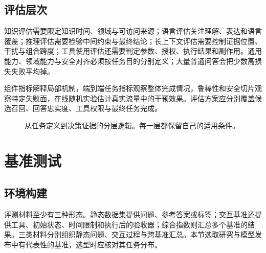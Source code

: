 \documentclass[../textbook.tex]{subfiles}
\begin{document}
\subsection{评估层次}
知识评估需要限定知识时间、领域与可访问来源；语言评估关注理解、表达和语言覆盖；推理评估需要检验中间约束与最终结论；长上下文评估需要控制证据位置、干扰与组合跨度；工具使用评估还需要判定参数、授权、执行结果和副作用。通用能力、领域能力与安全对齐必须按任务目的分别定义；大量普通问答会把少数高损失失败平均掉。

组件指标解释局部机制，端到端任务指标观察整体完成情况，鲁棒性和安全切片观察特定失败面，在线随机实验估计真实流量中的干预效果。评估方案应分别覆盖候选召回、回答忠实度、工具权限与最终任务完成。

\begin{figure}[htbp]
\centering
{}
\caption[从任务定义到决策证据的分层逻辑]{从任务定义到决策证据的分层逻辑。每一层都保留自己的适用条件。}\label{fig:eval-evidence}
\end{figure}

\section{基准测试}

\label{sec:eval-benchmarks}
\subsection{环境构建}
评测材料至少有三种形态。静态数据集提供问题、参考答案或标签；交互基准还提供工具、初始状态、时间限制和执行后的验收器；综合指数则汇总多个基准的结果。三类材料分别组织静态问题、交互过程与跨基准汇总。本节选取研究与模型发布中有代表性的基准，选型时应核对其任务分布。
\end{document}
